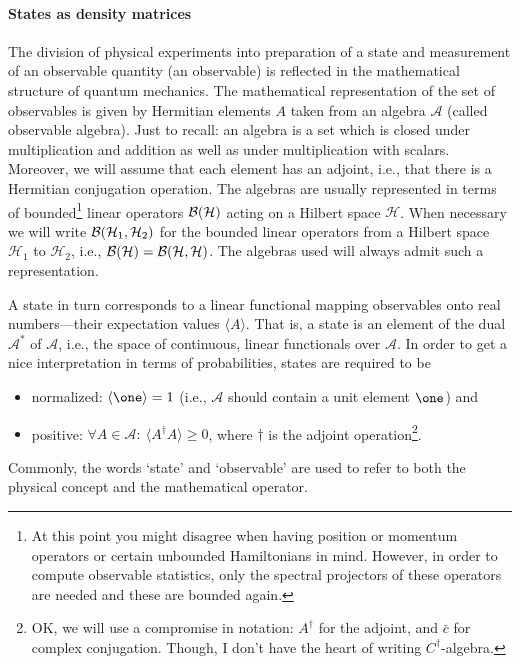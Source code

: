 \documentclass[11pt,a4paper]{article}
\theoremstyle{plain}
\theoremstyle{definition}
\theoremstyle{remark}
\numberwithin{equation}{section}
\begin{document}
\paragraph{States as density matrices}
The division of physical experiments into preparation of a state and measurement of an observable quantity (an observable) is reflected in the mathematical structure of quantum mechanics. The mathematical representation of the set of observables is given by Hermitian elements $A$ taken from an algebra $\mathcal{A}$ (called observable algebra). Just to recall: an algebra is a set which is closed under multiplication and addition as well as under multiplication with scalars. Moreover, we will assume that each element has an adjoint, i.e., that there is a Hermitian conjugation operation. The algebras are usually represented in terms of bounded\footnote{At this point you might disagree when having position or momentum operators or certain unbounded Hamiltonians in mind. However, in order to compute observable statistics, only the spectral projectors of these operators are needed and these are bounded again.}
linear operators $\mathcal{B}(\mathcal{H})$ acting on a Hilbert space $\mathcal{H}$. When necessary we will write $\mathcal{B}(\mathcal{H}_1,\mathcal{H}_2)$ for the bounded linear operators from a Hilbert space $\mathcal{H}_1$ to $\mathcal{H}_2$, i.e., $\mathcal{B}(\mathcal{H})=\mathcal{B}(\mathcal{H},\mathcal{H})$. The algebras used will always admit such a representation.

A state in turn corresponds to a linear functional mapping observables onto real numbers---their expectation values $\langle A\rangle$. That is, a state is an element of the dual $\mathcal{A}^\ast$ of $\mathcal{A}$, i.e., the space of continuous, linear functionals over $\mathcal{A}$. In order to get a nice interpretation in terms of probabilities, states are required to be
\begin{itemize}
    \item normalized: $\langle \one\rangle = 1$ (i.e., $\mathcal{A}$ should contain a unit element $\one$) and
    \item positive: $\forall A\in \mathcal{A}:\ \langle A^\dagger A\rangle \ge 0$, where $\dagger$ is the adjoint operation\footnote{OK, we will use a compromise in notation: $A^\dagger$ for the adjoint, and $\bar{c}$ for complex conjugation. Though, I don't have the heart of writing $C^\dagger$-algebra.}.
\end{itemize}
Commonly, the words `state' and `observable' are used to refer to both the physical concept and the mathematical operator.
\end{document}
